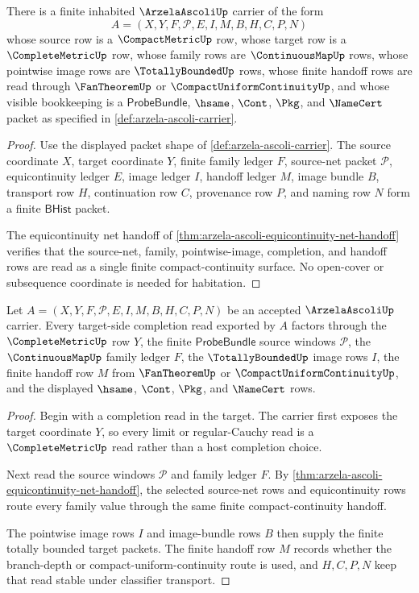 \begin{theorem}
\label{thm:arzela-ascoli-carrier-habitation}
There is a finite inhabited $\ArzelaAscoliUp$ carrier of the form
$$
A=(X,Y,F,\mathcal{P},E,I,M,B,H,C,P,N)
$$
whose source row is a $\CompactMetricUp$ row, whose target row is a $\CompleteMetricUp$ row, whose family rows are $\ContinuousMapUp$ rows, whose pointwise image rows are $\TotallyBoundedUp$ rows, whose finite handoff rows are read through $\FanTheoremUp$ or $\CompactUniformContinuityUp$, and whose visible bookkeeping is a $\mathsf{ProbeBundle}$, $\hsame$, $\Cont$, $\Pkg$, and $\NameCert$ packet as specified in \autoref{def:arzela-ascoli-carrier}.
\end{theorem}
\begin{proof}
Use the displayed packet shape of \autoref{def:arzela-ascoli-carrier}. The source coordinate $X$, target coordinate $Y$, finite family ledger $F$, source-net packet $\mathcal{P}$, equicontinuity ledger $E$, image ledger $I$, handoff ledger $M$, image bundle $B$, transport row $H$, continuation row $C$, provenance row $P$, and naming row $N$ form a finite $\mathsf{BHist}$ packet.

The equicontinuity net handoff of \autoref{thm:arzela-ascoli-equicontinuity-net-handoff} verifies that the source-net, family, pointwise-image, completion, and handoff rows are read as a single finite compact-continuity surface. No open-cover or subsequence coordinate is needed for habitation.
\end{proof}

\begin{theorem}
\label{thm:arzela-ascoli-completion-window-readback}
Let $A=(X,Y,F,\mathcal{P},E,I,M,B,H,C,P,N)$ be an accepted $\ArzelaAscoliUp$ carrier. Every target-side completion read exported by $A$ factors through the $\CompleteMetricUp$ row $Y$, the finite $\mathsf{ProbeBundle}$ source windows $\mathcal{P}$, the $\ContinuousMapUp$ family ledger $F$, the $\TotallyBoundedUp$ image rows $I$, the finite handoff row $M$ from $\FanTheoremUp$ or $\CompactUniformContinuityUp$, and the displayed $\hsame$, $\Cont$, $\Pkg$, and $\NameCert$ rows.
\end{theorem}
\begin{proof}
Begin with a completion read in the target. The carrier first exposes the target coordinate $Y$, so every limit or regular-Cauchy read is a $\CompleteMetricUp$ read rather than a host completion choice.

Next read the source windows $\mathcal{P}$ and family ledger $F$. By \autoref{thm:arzela-ascoli-equicontinuity-net-handoff}, the selected source-net rows and equicontinuity rows route every family value through the same finite compact-continuity handoff.

The pointwise image rows $I$ and image-bundle rows $B$ then supply the finite totally bounded target packets. The finite handoff row $M$ records whether the branch-depth or compact-uniform-continuity route is used, and $H,C,P,N$ keep that read stable under classifier transport.
\end{proof}

